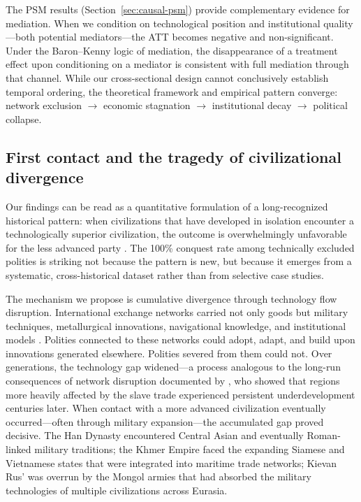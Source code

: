 \documentclass[pdflatex,sn-basic]{sn-jnl}
\theoremstyle{thmstyleone}%
\theoremstyle{thmstyletwo}%
\theoremstyle{thmstylethree}%
\begin{document}
The PSM results (Section~\ref{sec:causal-psm}) provide complementary evidence for mediation. When we condition on technological position and institutional quality---both potential mediators---the ATT becomes negative and non-significant. Under the Baron--Kenny logic of mediation, the disappearance of a treatment effect upon conditioning on a mediator is consistent with full mediation through that channel. While our cross-sectional design cannot conclusively establish temporal ordering, the theoretical framework and empirical pattern converge: network exclusion $\to$ economic stagnation $\to$ institutional decay $\to$ political collapse.

\subsection{First contact and the tragedy of civilizational divergence}\label{sec:disc-firstcontact}

Our findings can be read as a quantitative formulation of a long-recognized historical pattern: when civilizations that have developed in isolation encounter a technologically superior civilization, the outcome is overwhelmingly unfavorable for the less advanced party \citep{Diamond1997, DiamondBellwood2003}. The 100\% conquest rate among technically excluded polities is striking not because the pattern is new, but because it emerges from a systematic, cross-historical dataset rather than from selective case studies.

The mechanism we propose is cumulative divergence through technology flow disruption. International exchange networks carried not only goods but military techniques, metallurgical innovations, navigational knowledge, and institutional models \citep{Mokyr2002, Pomeranz2000}. Polities connected to these networks could adopt, adapt, and build upon innovations generated elsewhere. Polities severed from them could not. Over generations, the technology gap widened---a process analogous to the long-run consequences of network disruption documented by \citet{Nunn2008}, who showed that regions more heavily affected by the slave trade experienced persistent underdevelopment centuries later. When contact with a more advanced civilization eventually occurred---often through military expansion---the accumulated gap proved decisive. The Han Dynasty encountered Central Asian and eventually Roman-linked military traditions; the Khmer Empire faced the expanding Siamese and Vietnamese states that were integrated into maritime trade networks; Kievan Rus' was overrun by the Mongol armies that had absorbed the military technologies of multiple civilizations across Eurasia.
\end{document}
